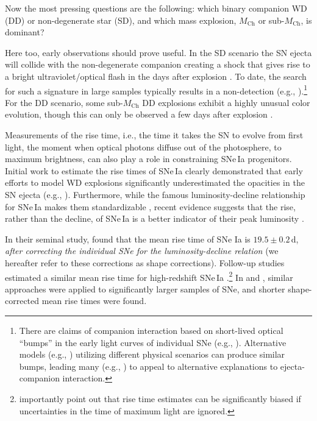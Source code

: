 \documentclass[twocolumn]{./aastex63}
\begin{document}
Now the most pressing questions are the following: which binary companion WD
(DD) or non-degenerate star (SD), and which mass explosion, $M_\mathrm{Ch}$ or
sub-$M_\mathrm{Ch}$, is dominant?

Here too, early observations should prove useful. In the SD scenario the SN
ejecta will collide with the non-degenerate companion creating a shock that
gives rise to a bright ultraviolet/optical flash in the days after explosion
\citep{Kasen10a}. To date, the search for such a signature in large samples
typically results in a non-detection (e.g.,
\citealt{Hayden10,Ganeshalingam11,Bianco11}).\footnote{There are claims of
companion interaction based on short-lived optical ``bumps'' in the early
light curves of individual SNe (e.g.,
\citealt{Cao15,Marion16,Hosseinzadeh17,Dimitriadis19}). Alternative models
(e.g., \citealt{Dessart14,Piro16,Levanon17,Magee20a}) utilizing different
physical scenarios can produce similar bumps, leading many (e.g.,
\citealt{Kromer16,Noebauer17,Miller18,Shappee18,Shappee19}) to appeal to
alternative explanations to ejecta-companion interaction.} For the DD
scenario, some sub-$M_\mathrm{Ch}$ DD explosions exhibit a highly unusual
color evolution, though this can only be observed a few days after explosion
\citep{Noebauer17,Polin19}.

Measurements of the rise time, i.e., the time it takes the SN to evolve from
first light, the moment when optical photons diffuse out of the photosphere,
to maximum brightness, can also play a role in constraining SNe\,Ia
progenitors. Initial work to estimate the rise times of SNe\,Ia clearly
demonstrated that early efforts to model WD explosions significantly
underestimated the opacities in the SN ejecta (e.g., \citealt{Riess99a}).
Furthermore, while the famous luminosity-decline relationship for SNe\,Ia makes
them standardizable \citep{Phillips93}, recent evidence suggests that the
rise, rather than the decline, of SNe\,Ia is a better indicator of their peak
luminosity \citep{Hayden19}. 

In their seminal study, \citet{Riess99a} found that the mean rise time of SNe
Ia is $19.5 \pm 0.2$\,d, \textit{after correcting the individual SNe for the
luminosity-decline relation} (we hereafter refer to these corrections as shape
corrections). Follow-up studies estimated a similar mean rise time for
high-redshift SNe\,Ia \citep{Aldering00,Conley06}.\footnote{\citet{Aldering00}
importantly point out that rise time estimates can be significantly biased if
uncertainties in the time of maximum light are ignored.} In \citet{Hayden10}
and \citet{Ganeshalingam11}, similar approaches were applied to significantly
larger samples of SNe, and shorter shape-corrected mean rise times were found.
\end{document}
